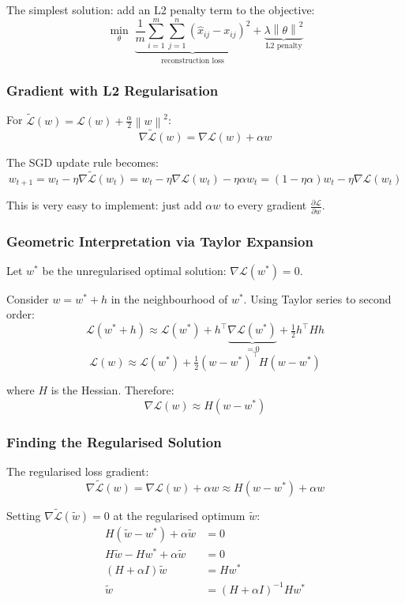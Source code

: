 \documentclass[12pt,a4paper]{article}
\newcommand{\norm}[1]{\left\|#1\right\|}
\newcommand{\grad}{\nabla}
\newcommand{\Loss}{\mathcal{L}}
\begin{document}
The simplest solution: add an L2 penalty term to the objective:
\[
  \min_{\theta}\;
  \underbrace{\frac{1}{m}\sum_{i=1}^{m}\sum_{j=1}^{n}(\hat{x}_{ij} - x_{ij})^2}_{\text{reconstruction loss}}
  + \underbrace{\lambda\norm{\theta}^2}_{\text{L2 penalty}}
\]

\subsubsection{Gradient with L2 Regularisation}

For $\tilde{\Loss}(w) = \Loss(w) + \frac{\alpha}{2}\norm{w}^2$:
\[
  \grad\tilde{\Loss}(w) = \grad\Loss(w) + \alpha w
\]

The SGD update rule becomes:
\[
  w_{t+1} = w_t - \eta\grad\tilde{\Loss}(w_t)
  = w_t - \eta\grad\Loss(w_t) - \eta\alpha w_t
  = (1 - \eta\alpha)w_t - \eta\grad\Loss(w_t)
\]

This is very easy to implement: just add $\alpha w$ to every gradient $\frac{\partial\Loss}{\partial w}$.

\subsubsection{Geometric Interpretation via Taylor Expansion}

Let $w^*$ be the unregularised optimal solution: $\grad\Loss(w^*) = 0$.

Consider $w = w^* + h$ in the neighbourhood of $w^*$. Using Taylor series to second order:
\[
  \Loss(w^* + h) \approx \Loss(w^*)
    + h^\top \underbrace{\grad\Loss(w^*)}_{=0}
    + \tfrac{1}{2}h^\top H h
\]
\[
  \Loss(w) \approx \Loss(w^*) + \tfrac{1}{2}(w-w^*)^\top H (w-w^*)
\]

where $H$ is the Hessian. Therefore:
\[
  \boxed{\grad\Loss(w) \approx H(w - w^*)}
\]

\subsubsection{Finding the Regularised Solution}

The regularised loss gradient:
\[
  \grad\tilde{\Loss}(w) = \grad\Loss(w) + \alpha w \approx H(w-w^*) + \alpha w
\]

Setting $\grad\tilde{\Loss}(\tilde{w}) = 0$ at the regularised optimum $\tilde{w}$:
\begin{align*}
  H(\tilde{w} - w^*) + \alpha\tilde{w} &= 0\\
  H\tilde{w} - Hw^* + \alpha\tilde{w} &= 0\\
  (H + \alpha I)\tilde{w} &= Hw^*\\
  \tilde{w} &= (H + \alpha I)^{-1}Hw^*
\end{align*}
\end{document}

